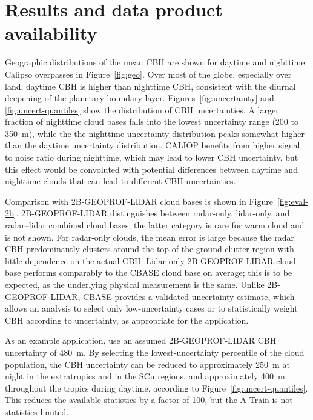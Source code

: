 \documentclass[essd,manuscript]{copernicus}\usepackage[]{graphicx}\usepackage[]{color}
\newcommand{\hlnum}[1]{\textcolor[rgb]{0.686,0.059,0.569}{#1}}%
\newcommand\comment[2]{\{\hlnum{ \textit{#1}: #2}\}}
\newcommand\commentjm[1]{\comment{$j_\mu$}{#1}}
\begin{document}

\section{Results and data product availability}
\label{sec:results}

Geographic distributions of the mean CBH are shown for daytime and nighttime
Calipso overpasses in Figure~\ref{fig:geo}.  Over most of the globe, especially
over land, daytime CBH is higher than nighttime CBH, consistent with the diurnal
deepening of the planetary boundary layer.  Figures~\ref{fig:uncertainty} and
\ref{fig:uncert-quantiles} show the distribution of CBH uncertainties.  A larger
fraction of nighttime cloud bases falls into the lowest uncertainty range (200
to 350~m), while the the nighttime uncertainty distribution peaks somewhat
higher than the daytime uncertainty distribution.  CALIOP benefits from higher
signal to noise ratio during nighttime, which may lead
to lower CBH uncertainty, but this effect would be convoluted with potential
differences between daytime and nighttime clouds that can lead to different CBH
uncertainties.  %

Comparison with 2B-GEOPROF-LIDAR cloud bases is shown in
Figure~\ref{fig:eval-2b}.   2B-GEOPROF-LIDAR distinguishes between radar-only,
lidar-only, and radar--lidar combined cloud bases; the latter category is rare
for warm cloud and is not shown.  For radar-only clouds, the mean error is large
because the radar CBH predominantly clusters around the top of the
ground clutter region with little dependence on the actual CBH.
Lidar-only 2B-GEOPROF-LIDAR cloud base performs comparably to the CBASE cloud
base on average; this is to be expected, as the underlying physical measurement
is the same.   Unlike 2B-GEOPROF-LIDAR, CBASE provides a validated uncertainty
estimate, which allows an analysis to select only
low-uncertainty cases or to statistically weight CBH according to
uncertainty, as appropriate for the application.

As an example application, \citep{Stephens2012a,Stephens2012b} use an assumed
2B-GEOPROF-LIDAR CBH uncertainty of 480~m.  By selecting the lowest-uncertainty
percentile of the cloud population, the CBH uncertainty can be reduced to
approximately 250~m at night in the extratropics and in the SCu regions, and
approximately 400~m throughout the tropics during daytime, according to
Figure~\ref{fig:uncert-quantiles}.  This reduces the available statistics by a
factor of 100, but the A-Train is not statistics-limited.
\end{document}
